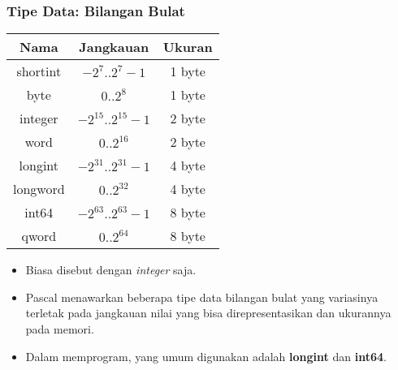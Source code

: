 \documentclass{beamer}
\begin{document}
\begin{frame}
\frametitle{Tipe Data: Bilangan Bulat}
\begin{table}[ht]
    \begin{tabular}{|c|c|c|}
        \hline Nama  & Jangkauan  & Ukuran \\
        \hline shortint & $-2^7 .. 2^7-1$ & 1 byte \\
        \hline byte & $0 .. 2^8$ & 1 byte\\
        \hline integer & $-2^{15} .. 2^{15}-1$ & 2 byte\\
        \hline word & $0 .. 2^{16}$ & 2 byte\\
        \hline longint & $-2^{31} .. 2^{31}-1$ & 4 byte\\
        \hline longword & $0 .. 2^{32}$ & 4 byte\\
        \hline int64 & $-2^{63} .. 2^{63}-1$ & 8 byte\\
        \hline qword & $0 .. 2^{64}$ & 8 byte\\
        \hline
    \end{tabular}
\end{table}
\begin{itemize}
    \item Biasa disebut dengan \textit{integer} saja.
    \item Pascal menawarkan beberapa tipe data bilangan bulat yang variasinya terletak pada jangkauan nilai yang bisa direpresentasikan dan ukurannya pada memori.
    \item Dalam memprogram, yang umum digunakan adalah \alert{\textbf{longint}} dan \alert{\textbf{int64}}.
\end{itemize}
\end{frame}
\end{document}
